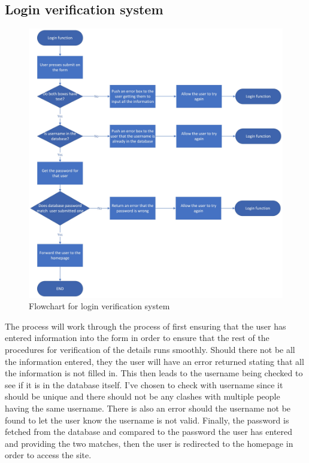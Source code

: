 \subsection{Login verification system}
\begin{figure}[H]
    \centering
    \includegraphics[scale=0.2]{ch2_design/c3_login.jpeg}
    \caption{Flowchart for login verification system}
    \label{fig:flow_login}
\end{figure}
The process will work through the process of first ensuring that the user has entered information into the form in order to ensure that the rest of the procedures for verification of the details runs smoothly. Should there not be all the information entered, they the user will have an error returned stating that all the information is not filled in. This then leads to the username being checked to see if it is in the database itself. I’ve chosen to check with username since it should be unique and there should not be any clashes with multiple people having the same username. There is also an error should the username not be found to let the user know the username is not valid. Finally, the password is fetched from the database and compared to the password the user has entered and providing the two matches, then the user is redirected to the homepage in order to access the site.


